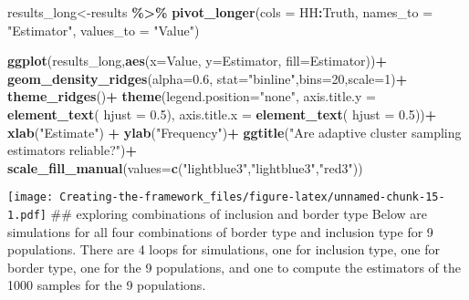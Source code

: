 \documentclass[
]{article}
\newenvironment{Shaded}{\begin{snugshade}}{\end{snugshade}}
\newcommand{\AttributeTok}[1]{\textcolor[rgb]{0.13,0.29,0.53}{#1}}
\newcommand{\DecValTok}[1]{\textcolor[rgb]{0.00,0.00,0.81}{#1}}
\newcommand{\FloatTok}[1]{\textcolor[rgb]{0.00,0.00,0.81}{#1}}
\newcommand{\FunctionTok}[1]{\textcolor[rgb]{0.13,0.29,0.53}{\textbf{#1}}}
\newcommand{\NormalTok}[1]{#1}
\newcommand{\OtherTok}[1]{\textcolor[rgb]{0.56,0.35,0.01}{#1}}
\newcommand{\SpecialCharTok}[1]{\textcolor[rgb]{0.81,0.36,0.00}{\textbf{#1}}}
\newcommand{\StringTok}[1]{\textcolor[rgb]{0.31,0.60,0.02}{#1}}
\begin{document}
\begin{Shaded}
\begin{Highlighting}[]
\NormalTok{results\_long}\OtherTok{\textless{}{-}}\NormalTok{results }\SpecialCharTok{\%\textgreater{}\%} 
  \FunctionTok{pivot\_longer}\NormalTok{(}\AttributeTok{cols =}\NormalTok{ HH}\SpecialCharTok{:}\NormalTok{Truth,}
               \AttributeTok{names\_to =} \StringTok{"Estimator"}\NormalTok{, }
               \AttributeTok{values\_to =} \StringTok{"Value"}\NormalTok{)}

\FunctionTok{ggplot}\NormalTok{(results\_long,}\FunctionTok{aes}\NormalTok{(}\AttributeTok{x=}\NormalTok{Value, }\AttributeTok{y=}\NormalTok{Estimator, }\AttributeTok{fill=}\NormalTok{Estimator))}\SpecialCharTok{+}
  \FunctionTok{geom\_density\_ridges}\NormalTok{(}\AttributeTok{alpha=}\FloatTok{0.6}\NormalTok{, }\AttributeTok{stat=}\StringTok{"binline"}\NormalTok{,}\AttributeTok{bins=}\DecValTok{20}\NormalTok{,}\AttributeTok{scale=}\DecValTok{1}\NormalTok{)}\SpecialCharTok{+}
  \FunctionTok{theme\_ridges}\NormalTok{()}\SpecialCharTok{+}
  \FunctionTok{theme}\NormalTok{(}\AttributeTok{legend.position=}\StringTok{"none"}\NormalTok{,}
        \AttributeTok{axis.title.y =} \FunctionTok{element\_text}\NormalTok{( }\AttributeTok{hjust =} \FloatTok{0.5}\NormalTok{),}
        \AttributeTok{axis.title.x =} \FunctionTok{element\_text}\NormalTok{( }\AttributeTok{hjust =} \FloatTok{0.5}\NormalTok{))}\SpecialCharTok{+}
  \FunctionTok{xlab}\NormalTok{(}\StringTok{"Estimate"}\NormalTok{) }\SpecialCharTok{+}
  \FunctionTok{ylab}\NormalTok{(}\StringTok{"Frequency"}\NormalTok{)}\SpecialCharTok{+}
  \FunctionTok{ggtitle}\NormalTok{(}\StringTok{"Are adaptive cluster sampling estimators reliable?"}\NormalTok{)}\SpecialCharTok{+}
  \FunctionTok{scale\_fill\_manual}\NormalTok{(}\AttributeTok{values=}\FunctionTok{c}\NormalTok{(}\StringTok{"lightblue3"}\NormalTok{,}\StringTok{"lightblue3"}\NormalTok{,}\StringTok{"red3"}\NormalTok{))}
\end{Highlighting}
\end{Shaded}

\texttt{[image: Creating-the-framework\_files/figure-latex/unnamed-chunk-15-1.pdf]}
\#\# exploring combinations of inclusion and border type Below are
simulations for all four combinations of border type and inclusion type
for 9 populations. There are 4 loops for simulations, one for inclusion
type, one for border type, one for the 9 populations, and one to compute
the estimators of the 1000 samples for the 9 populations.
\end{document}
